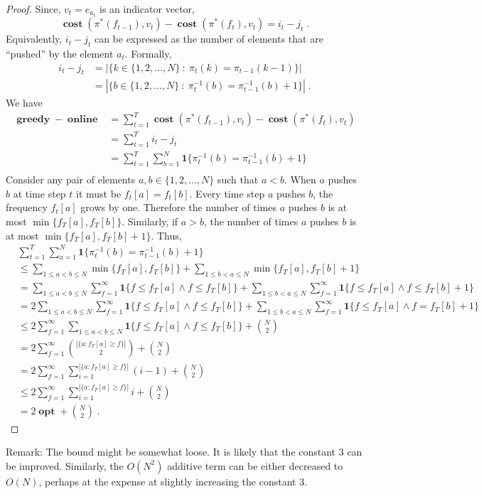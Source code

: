\documentclass[12pt]{article}
\newcommand{\indicator}{\mathbf{1}}
\DeclareMathOperator{\cost}{\mathbf{cost}}
\DeclareMathOperator{\greedy}{\mathbf{greedy}}
\DeclareMathOperator{\online}{\mathbf{online}}
\DeclareMathOperator{\opt}{\mathbf{opt}}
\begin{document}
\begin{proof}
Since, $v_t = e_{a_t}$ is an indicator vector,
$$
\cost(\pi^*(f_{t-1}), v_t) - \cost(\pi^*(f_t), v_t) = i_t - j_t \; .
$$
Equivalently, $i_t - j_t$ can be expressed as the number of elements that are
``pushed'' by the element $a_t$. Formally,
\begin{align*}
i_t - j_t
& = |\{ k \in \{1,2,\dots,N\} ~:~ \pi_t(k) = \pi_{t-1}(k-1) \}| \\
& = |\{ b \in \{1,2,\dots,N\} ~:~ \pi_t^{-1}(b) = \pi_{t-1}^{-1}(b) + 1 \}| \; .
\end{align*}
We have
\begin{align*}
\greedy - \online
& = \sum_{t=1}^T \cost(\pi^*(f_{t-1}), v_t) - \cost(\pi^*(f_t), v_t) \\
& = \sum_{t=1}^T i_t - j_t \\
& = \sum_{t=1}^T \sum_{b=1}^N \indicator\{\pi_t^{-1}(b) = \pi_{t-1}^{-1}(b) + 1 \} \\
\end{align*}
Consider any pair of elements $a,b \in \{1,2,\dots,N\}$ such that $a < b$. When
$a$ pushes $b$ at time step $t$ it must be $f_t[a] = f_t[b]$. Every time step
$a$ pushes $b$, the frequency $f_t[a]$ grows by one. Therefore the number of
times $a$ pushes $b$ is at most $\min\{f_T[a], f_T[b]\}$. Similarly, if $a > b$,
the number of times $a$ pushes $b$ is at most $\min\{f_T[a], f_T[b] + 1\}$.
Thus,
\begin{align*}
& \sum_{t=1}^T \sum_{a=1}^N \indicator\{\pi_t^{-1}(b) = \pi_{t-1}^{-1}(b) + 1 \} \\
& \le
\sum_{1 \le a < b \le N} \min\{f_T[a], f_T[b]\} +
\sum_{1 \le b < a \le N} \min\{f_T[a], f_T[b] + 1\} \\
& =
\sum_{1 \le a < b \le N} \sum_{f=1}^\infty \indicator\{f \le f_T[a] \wedge f \le f_T[b] \}
+ \sum_{1 \le b < a \le N} \sum_{f=1}^\infty \indicator\{f \le f_T[a] \wedge f \le f_T[b] + 1 \} \\
& = 2  \sum_{1 \le a < b \le N} \sum_{f=1}^\infty \indicator\{f \le f_T[a] \wedge f \le f_T[b] \} + \sum_{1 \le b < a \le N} \sum_{f=1}^\infty \indicator\{f \le f_T[a] \wedge f = f_T[b] + 1 \} \\
& \le 2 \sum_{f=1}^\infty \sum_{1 \le a < b \le N} \indicator\{f \le f_T[a] \wedge f \le f_T[b] \} + \binom{N}{2} \\
& = 2 \sum_{f=1}^\infty \binom{|\{a : f_T[a] \ge f \}|}{2} + \binom{N}{2} \\
& = 2 \sum_{f=1}^\infty \sum_{i=1}^{|\{a : f_T[a] \ge f \}|} (i - 1) + \binom{N}{2} \\
& \le 2 \sum_{f=1}^\infty \sum_{i=1}^{|\{a : f_T[a] \ge f \}|} i + \binom{N}{2} \\
& = 2 \opt + \binom{N}{2} \; .
\end{align*}
\end{proof}

Remark: The bound might be somewhat loose. It is likely that the constant $3$
can be improved. Similarly, the $O(N^2)$ additive term can be either decreased
to $O(N)$, perhaps at the expense at slightly increasing the constant $3$.
\end{document}
